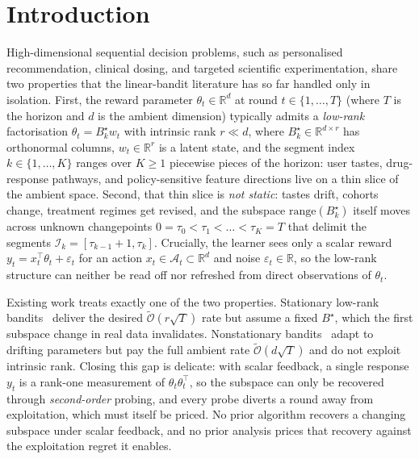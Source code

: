 \documentclass{article}
\newcommand{\R}{\mathbb{R}}
\newcommand{\cA}{\mathcal{A}}
\newcommand{\cI}{\mathcal{I}}
\newcommand{\tilO}{\widetilde{\mathcal{O}}}
\newcommand{\range}{\mathrm{range}}
\begin{document}
\section{Introduction}
\label{sec:intro}

High-dimensional sequential decision problems, such as personalised
recommendation, clinical dosing, and targeted scientific
experimentation, share two properties that the linear-bandit
literature has so far handled only in isolation. First, the reward
parameter $\theta_t\in\R^d$ at round $t\in\{1,\dots,T\}$ (where $T$
is the horizon and $d$ is the ambient dimension) typically admits a
\emph{low-rank} factorisation $\theta_t=B_k^\star w_t$ with intrinsic
rank $r\ll d$, where $B_k^\star\in\R^{d\times r}$ has orthonormal
columns, $w_t\in\R^r$ is a latent state, and the segment index
$k\in\{1,\dots,K\}$ ranges over $K\ge 1$ piecewise pieces of the
horizon: user tastes, drug-response pathways, and policy-sensitive
feature directions live on a thin slice of the ambient space.
Second, that thin slice is \emph{not static}: tastes drift, cohorts
change, treatment regimes get revised, and the subspace
$\range(B_k^\star)$ itself moves across unknown changepoints
$0=\tau_0<\tau_1<\dots<\tau_K=T$ that delimit the segments
$\cI_k=[\tau_{k-1}+1,\tau_k]$. Crucially, the learner sees only a
scalar reward $y_t=x_t^\top\theta_t+\varepsilon_t$ for an action
$x_t\in\cA_t\subset\R^d$ and noise $\varepsilon_t\in\R$, so the
low-rank structure can neither be read off nor refreshed from direct
observations of $\theta_t$.

Existing work treats exactly one of the two properties.
Stationary low-rank
bandits~\citep{jun2019bilinear,jedra2024low,lu2021low}
deliver the desired $\tilO(r\sqrt T)$ rate but assume a fixed $B^\star$,
which the first subspace change in real data invalidates.
Nonstationary bandits~\citep{russac2019weighted,cheung2019learning}
adapt to drifting parameters but pay the full ambient rate
$\tilO(d\sqrt T)$ and do not exploit intrinsic rank. Closing this gap is
delicate: with scalar feedback, a single response $y_t$ is a rank-one
measurement of $\theta_t\theta_t^\top$, so the subspace can only be
recovered through \emph{second-order} probing, and every probe diverts
a round away from exploitation, which must itself be priced. No prior
algorithm recovers a changing subspace under scalar feedback, and no
prior analysis prices that recovery against the exploitation regret it
enables.
\end{document}
